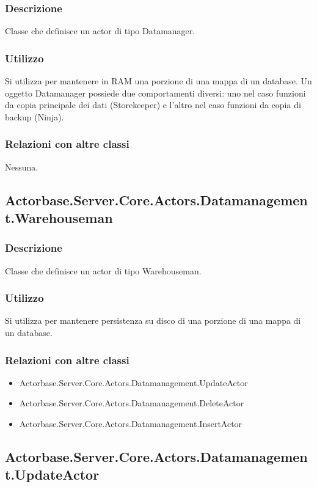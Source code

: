 \documentclass[a4paper]{article}
\begin{document}
			\subsubsection{Descrizione}
				Classe che definisce un actor di tipo Datamanager.
			\subsubsection{Utilizzo}
				Si utilizza per mantenere in RAM una porzione di una mappa di un database. Un oggetto Datamanager possiede due comportamenti diversi: uno nel caso funzioni da copia principale dei dati (Storekeeper) e l'altro nel caso funzioni da copia di backup (Ninja).
			\subsubsection{Relazioni con altre classi}
				Nessuna.
			
		\subsection{Actorbase.Server.Core.Actors.Datamanagement.Warehouseman}
			\subsubsection{Descrizione}
				Classe che definisce un actor di tipo Warehouseman.
			\subsubsection{Utilizzo}
				Si utilizza per mantenere persistenza su disco di una porzione di una mappa di un database.
			\subsubsection{Relazioni con altre classi}
			\begin{itemize}
				\item Actorbase.Server.Core.Actors.Datamanagement.UpdateActor
				\item Actorbase.Server.Core.Actors.Datamanagement.DeleteActor
				\item Actorbase.Server.Core.Actors.Datamanagement.InsertActor
			\end{itemize}
			
		\subsection{Actorbase.Server.Core.Actors.Datamanagement.UpdateActor}
\end{document}
